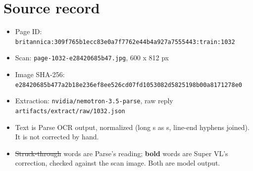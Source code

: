 \documentclass[10pt]{article}
\begin{document}
\section*{Source record}
\begin{itemize}
\item Page ID: \texttt{britannica:309f765b1ecc83e0a7f7762e44b4a927a7555443:train:1032}
\item Scan: \texttt{page-1032-e28420685b47.jpg}, 600 x 812 px
\item Image SHA-256: \texttt{\small e28420685b477a2b18e236ef8ee526cd07fd1053082d5825198b00a8171278e0}
\item Extraction: \texttt{nvidia/nemotron-3.5-parse}, raw reply \texttt{artifacts/extract/raw/1032.json}
\item Text is Parse OCR output, normalized (long s as s, line-end hyphens joined). It is not corrected by hand.
\item \sout{Struck-through} words are Parse's reading; \textbf{bold} words are Super VL's correction, checked against the scan image. Both are model output.
\end{itemize}
\end{document}
